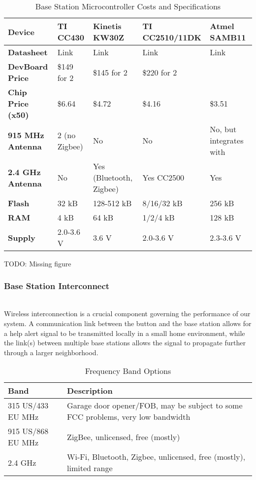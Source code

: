 \documentclass[journal]{IEEEtran}
\begin{document}
\begin{table*}[t]
  \centering
  \begin{tabular}{>{\bfseries}l|l l l l}
    Device & TI CC430 & Kinetis KW30Z & TI CC2510/11DK & Atmel SAMB11 \\
    \hline
    Datasheet & Link & Link & Link & Link \\
    DevBoard Price & \$149 for 2 & \$145 for 2 & \$220 for 2 & \\
    Chip Price (x50) & \$6.64 & \$4.72 & \$4.16 & \$3.51 \\
    915 MHz Antenna & 2 (no Zigbee) & No & No & No, but integrates with \\
    2.4 GHz Antenna & No & Yes (Bluetooth, Zigbee) & Yes CC2500 & Yes \\
    Flash & 32 kB & 128-512 kB & 8/16/32 kB & 256 kB \\
    RAM & 4 kB & 64 kB & 1/2/4 kB & 128 kB \\
    Supply & 2.0-3.6 V & 3.6 V & 2.0-3.6 V & 2.3-3.6 V
  \end{tabular}
  \caption{Base Station Microcontroller Costs and Specifications}
\end{table*}

TODO: Missing figure

\subsubsection{Base Station Interconnect}

\noindent \\ Wireless interconnection is a crucial component governing the performance of our system.  A communication link between the button and the base station allows for a help alert signal to be transmitted locally in a small home environment, while the link(s) between multiple base stations allows the signal to propagate further through a larger neighborhood.\\

\begin{table*}[t]
  \centering
  \begin{tabular}{l|l}
    Band & Description \\
    \hline
    315 US/433 EU MHz & Garage door opener/FOB, may be subject to some FCC problems, very low bandwidth \\
    915 US/868 EU MHz & ZigBee, unlicensed, free (mostly) \\
    2.4 GHz & Wi-Fi, Bluetooth, Zigbee, unlicensed, free (mostly), limited range
  \end{tabular}
  \caption{Frequency Band Options}
\end{table*}
\end{document}
